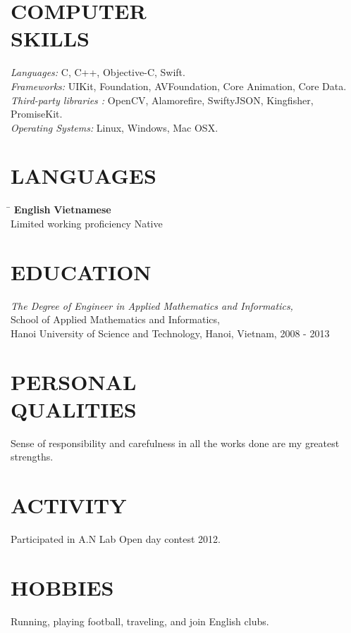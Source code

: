 \documentclass[margin, 10pt]{res}
\begin{document}
\begin{resume}
\section{COMPUTER \\ SKILLS}
   {\sl Languages:} C, C++, Objective-C, Swift.\\
   {\sl Frameworks:} UIKit, Foundation, AVFoundation, Core Animation, Core Data.\\
   {\sl Third-party libraries :} OpenCV, Alamorefire, SwiftyJSON, Kingfisher, PromiseKit.\\
   {\sl Operating Systems:} Linux, Windows, Mac OSX.

\section{LANGUAGES}
	\vspace{-0.1in}
	\begin{tabbing}
    \hspace{2.8in}\= \kill %
    \textbf{English}            \> \textbf{Vietnamese}\\
    Limited working proficiency \> Native\\
	\end{tabbing}\vspace{-20pt}
	
\section{EDUCATION}
   {\sl The Degree of Engineer in Applied Mathematics and Informatics,}\\
   School of Applied Mathematics and Informatics, \\
   Hanoi University of Science and Technology, Hanoi, Vietnam, 2008 - 2013 \\
	
\section{PERSONAL \\ QUALITIES} Sense of responsibility and carefulness in all the works done are my greatest strengths.\\
 
\section{ACTIVITY} Participated in A.N Lab Open day contest 2012.

\section{HOBBIES} Running, playing football, traveling, and join English clubs.

\end{resume}
\end{document}
